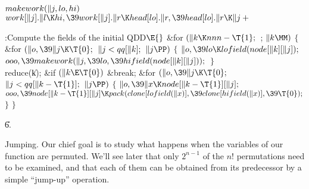 \Y\B\4\D$\\{makework}(\|j,\\{lo},\\{hi})$ \5
$\\{work}[\|j].\|l\K\\{hi},\39\\{work}[\|j].\|r\K\\{head}[\\{lo}].\|r,\39%
\\{head}[\\{lo}].\|r\K\|j+{}$\par
\Y\B\4:Compute the  fields of the initial QDD\X${}\E{}$\6
\&{for} ${}(\|k\K\\{nnn}-\T{1};{}$  ; ${}\|k\MM){}$\5
${}\{{}$\1\6
\&{for} ${}(\|o,\39\|j\K\T{0};{}$ ${}\|j<\\{qq}[\|k];{}$ ${}\|j\PP){}$\5
${}\{{}$\1\6
${}\|o,\39\\{lo}\K\\{lofield}(\\{node}[\|k][\|j]);{}$\6
${}\\{ooo},\39\\{makework}(\|j,\39\\{lo},\39\\{hifield}(\\{node}[\|k][%
\|j]));{}$\6
\4${}\}{}$\2\6
\\{reduce}(\|k);\6
\&{if} ${}(\|k\E\T{0}){}$\1\5
\&{break};\2\6
\&{for} ${}(\|o,\39\|j\K\T{0};{}$ ${}\|j<\\{qq}[\|k-\T{1}];{}$ ${}\|j\PP){}$\5
${}\{{}$\1\6
${}\|o,\39\|x\K\\{node}[\|k-\T{1}][\|j];{}$\6
${}\\{ooo},\39\\{node}[\|k-\T{1}][\|j]\K\\{pack}(\\{clone}[\\{lofield}(\|x)],%
\39\\{clone}[\\{hifield}(\|x)],\39\T{0});{}$\6
\4${}\}{}$\2\6
\4${}\}{}$\2\par
\U6.\fi

Jumping. Our chief goal is to study what happens when the
variables
of our function are permuted. We'll see later that only $2^{n-1}$
of the $n!$ permutations need to be examined, and that each of them
can be obtained from its predecessor by a simple ``jump-up'' operation.

